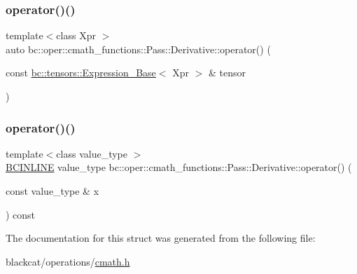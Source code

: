 \mbox{\label{structbc_1_1oper_1_1cmath__functions_1_1Pass_1_1Derivative_a6ce657f75aa3d81ce23cd3cfe93d0a21}} 
\subsubsection{\texorpdfstring{operator()()}{operator()()}\hspace{0.1cm}{\footnotesize\ttfamily [2/3]}}
{\footnotesize\ttfamily template$<$class Xpr $>$ \\
auto bc\+::oper\+::cmath\+\_\+functions\+::\+Pass\+::\+Derivative\+::operator() (\begin{DoxyParamCaption}\item[{const \hyperlink{classbc_1_1tensors_1_1Expression__Base}{bc\+::tensors\+::\+Expression\+\_\+\+Base}$<$ Xpr $>$ \&}]{tensor }\end{DoxyParamCaption})\hspace{0.3cm}{\ttfamily [inline]}}

\mbox{\label{structbc_1_1oper_1_1cmath__functions_1_1Pass_1_1Derivative_a66d0b05bb7e41bb8db196e3713e6e10e}} 
\subsubsection{\texorpdfstring{operator()()}{operator()()}\hspace{0.1cm}{\footnotesize\ttfamily [3/3]}}
{\footnotesize\ttfamily template$<$class value\+\_\+type $>$ \\
\hyperlink{common_8h_a6699e8b0449da5c0fafb878e59c1d4b1}{B\+C\+I\+N\+L\+I\+NE} value\+\_\+type bc\+::oper\+::cmath\+\_\+functions\+::\+Pass\+::\+Derivative\+::operator() (\begin{DoxyParamCaption}\item[{const value\+\_\+type \&}]{x }\end{DoxyParamCaption}) const\hspace{0.3cm}{\ttfamily [inline]}}



The documentation for this struct was generated from the following file\+:\begin{DoxyCompactItemize}
\item 
blackcat/operations/\hyperlink{cmath_8h}{cmath.\+h}\end{DoxyCompactItemize}
